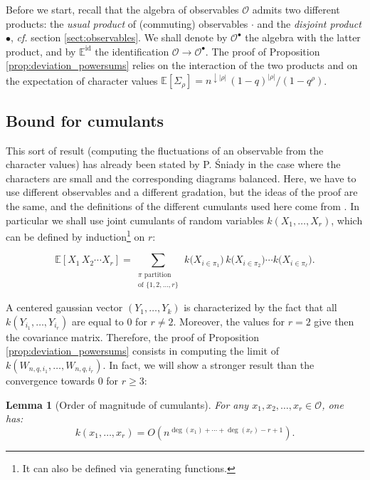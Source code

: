 \documentclass[10pt]{amsart}
\newtheorem{lemma}[theorem]{Lemma}
\theoremstyle{remark}
\newcommand{\esper}{\mathbb{E}}
\newcommand{\obs}{\mathscr{O}}
\begin{document}
\noindent Before we start, recall that the algebra of observables $\obs$ admits two different products: the \emph{usual product} of (commuting) observables $\cdot$ and the \emph{disjoint product} $\bullet$, \emph{cf.} section \ref{sect:observables}. We shall denote by $\obs^\bullet$ the algebra with the latter product, and by $\esper^\mathrm{id}$ the identification $\obs \to \obs^\bullet$. The proof of Proposition \ref{prop:deviation_powersums} relies on the interaction of the two products and on the expectation of character values $\esper[\varSigma_\rho]=n^{\downarrow |\rho|}\,(1-q)^{|\rho|}/(1-q^\rho)$.
\bigskip



\subsection{Bound for cumulants}\label{subsect:bound_cumulants} This sort of result (computing the fluctuations of an observable from the character values) has already been stated by P. \'Sniady in the case where the characters are small and the corresponding diagrams balanced. Here, we have to use different observables and a different gradation, but the ideas of the proof are the same, and the definitions of the different cumulants used here come from \cite{Sniady06}. In particular we shall use joint cumulants of random variables $k(X_1,\ldots,X_r)$, which can be defined by induction\footnote{It can also be defined via generating functions.} on $r$:

$$\esper[X_1 \,X_2 \cdots X_r]=\sum_{\substack{\pi \text{ partition}\\ \text{of } \{1,2,\ldots,r\} }} \, k\big(X_{i \in \pi_1}\big) \, k\big(X_{i \in \pi_2}\big) \cdots k\big(X_{i \in \pi_\ell}\big). $$

\noindent A centered gaussian vector $(Y_1,\ldots,Y_k)$ is characterized by the fact that all $k(Y_{i_1},\ldots,Y_{i_r})$ are equal to $0$ for $r \neq 2$. Moreover, the values for $r=2$ give then the covariance matrix. Therefore, the proof of Proposition \ref{prop:deviation_powersums} consists in computing the limit of $k(W_{n,q,i_1},\ldots,W_{n,q,i_r})$.
In fact, we will show a stronger result than the convergence towards $0$ for $r \geq 3$:
\begin{lemma}[Order of magnitude of cumulants]\label{lem:ordre_cumulants}
For any $x_1,x_2,\ldots,x_r \in \obs$, one has:
$$k(x_1,\ldots,x_r) = O\left(n^{\deg(x_1) + \cdots + \deg(x_r)-r+1}\right).$$
\end{lemma}\bigskip
\end{document}
